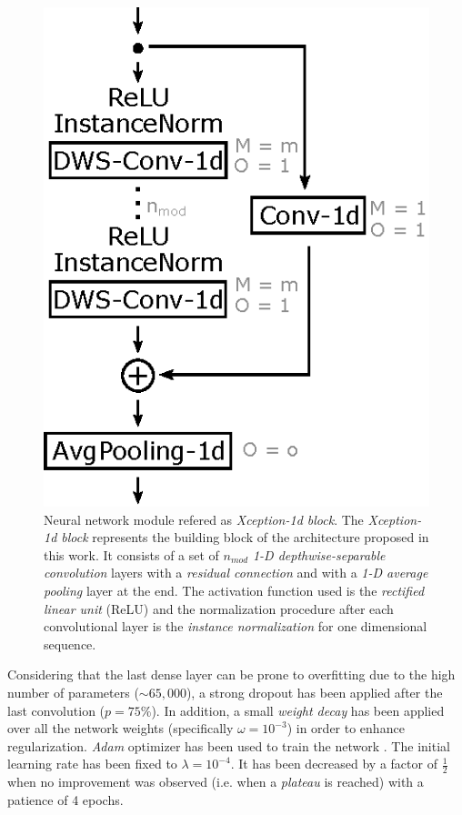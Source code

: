 \begin{figure}[ht]
	\centering
	\includegraphics[width=0.5\linewidth]{kws/images/xception_module.eps}
	\caption[\textit{Xception-1d} architecture building block]{Neural network module refered as \textit{Xception-1d block}. The \textit{Xception-1d block} represents the building block of the architecture proposed in this work. It consists of a set of $n_{mod}$ \textit{1-D depthwise-separable convolution} layers with a \textit{residual connection} and with a \textit{1-D average pooling} layer at the end. The activation function used is the \textit{rectified linear unit} (ReLU) and the normalization procedure after each convolutional layer is the \textit{instance normalization} for one dimensional sequence.}
	\label{fig:xceptionmodule}
\end{figure}



Considering that the last dense layer can be prone to overfitting due to the high number of parameters ($\sim 65,000$), a strong dropout \autocite{srivastava2014, Goodfellow2016} has been applied after the last convolution ($p = 75\%$). In addition, a small \textit{weight decay} \autocite{Krogh1991, haykin1998, Goodfellow2016} has been applied over all the network weights (specifically $\omega = 10^{-3}$) in order to enhance regularization. \textit{Adam} optimizer has been used to train the network \autocite{kingma14}. The initial learning rate has been fixed to $\lambda = 10^{-4}$. It has been decreased by a factor of $\frac{1}{2}$ when no improvement was observed (i.e. when a \textit{plateau} is reached) with a patience of 4 epochs.



